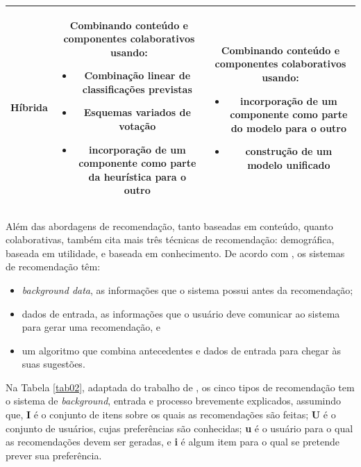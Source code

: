 \begin{table}[ht]
\begin{tabular}{ccc}
	\textbf{Híbrida} &  \begin{minipage} [t] {0.3\textwidth} Combinando conteúdo e componentes colaborativos usando: \begin{itemize} \item Combinação linear de classificações previstas \item Esquemas variados de votação \item incorporação de um componente como parte da heurística para o outro \end{itemize}        \end{minipage} & \begin{minipage} [t] {0.3\textwidth} Combinando conteúdo e componentes colaborativos usando: \begin{itemize} \item incorporação de um componente como parte do modelo para o outro \item construção de um modelo unificado \end{itemize} \end{minipage} \\ 
\bottomrule	
\end{tabular}
\end{table}

Além das abordagens de recomendação, tanto baseadas em conteúdo, quanto colaborativas,  também cita mais três técnicas de recomendação: demográfica, baseada em utilidade, e 
baseada em conhecimento. De acordo com , os sistemas de recomendação têm: 

\begin{itemize}

	\item \emph{background data}, as informações que o sistema possui antes da recomendação;

	\item dados de entrada, as informações que o usuário deve comunicar ao
	sistema para gerar uma recomendação, e

	\item um algoritmo que combina antecedentes e dados de entrada para chegar às suas sugestões.

\end{itemize}

Na Tabela \ref{tab02}, adaptada do trabalho de , os cinco tipos de 
recomendação tem o sistema de \emph{background}, entrada e processo brevemente explicados, 
assumindo que, \textbf{I} é o conjunto de itens sobre os quais as recomendações são feitas; \textbf{U} é o conjunto de usuários, cujas preferências são conhecidas; \textbf{u} 
é o usuário para o qual as recomendações devem ser geradas, e \textbf{i} é algum item para o qual se pretende prever sua preferência.


